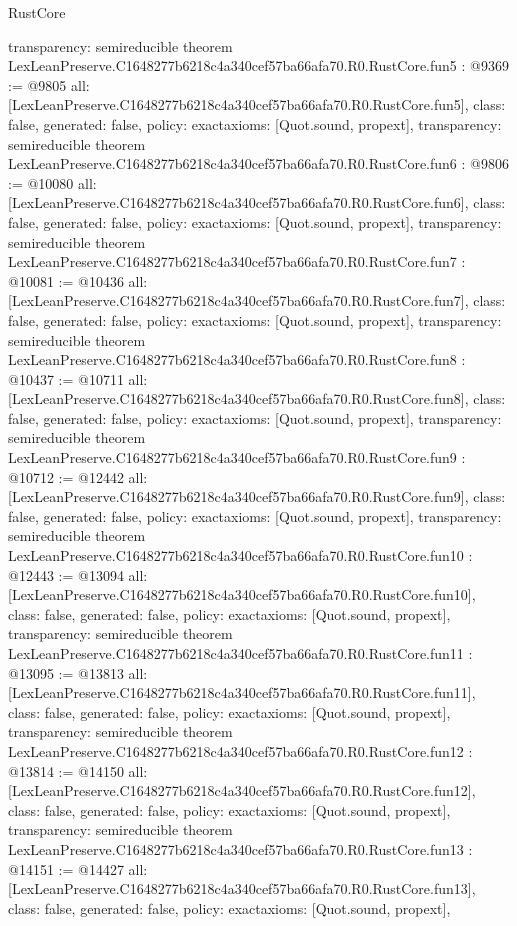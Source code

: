 \begin{lexlean}{RustCore}
\begin{coremodule}
{  transparency: semireducible
}
theorem LexLeanPreserve.C1648277b6218c4a340cef57ba66afa70.R0.RustCore.fun5 : @9369 := @9805 {
  all: [LexLeanPreserve.C1648277b6218c4a340cef57ba66afa70.R0.RustCore.fun5],
  class: false,
  generated: false,
  policy: exact{axioms: [Quot.sound, propext]},
  transparency: semireducible
}
theorem LexLeanPreserve.C1648277b6218c4a340cef57ba66afa70.R0.RustCore.fun6 : @9806 := @10080 {
  all: [LexLeanPreserve.C1648277b6218c4a340cef57ba66afa70.R0.RustCore.fun6],
  class: false,
  generated: false,
  policy: exact{axioms: [Quot.sound, propext]},
  transparency: semireducible
}
theorem LexLeanPreserve.C1648277b6218c4a340cef57ba66afa70.R0.RustCore.fun7 : @10081 := @10436 {
  all: [LexLeanPreserve.C1648277b6218c4a340cef57ba66afa70.R0.RustCore.fun7],
  class: false,
  generated: false,
  policy: exact{axioms: [Quot.sound, propext]},
  transparency: semireducible
}
theorem LexLeanPreserve.C1648277b6218c4a340cef57ba66afa70.R0.RustCore.fun8 : @10437 := @10711 {
  all: [LexLeanPreserve.C1648277b6218c4a340cef57ba66afa70.R0.RustCore.fun8],
  class: false,
  generated: false,
  policy: exact{axioms: [Quot.sound, propext]},
  transparency: semireducible
}
theorem LexLeanPreserve.C1648277b6218c4a340cef57ba66afa70.R0.RustCore.fun9 : @10712 := @12442 {
  all: [LexLeanPreserve.C1648277b6218c4a340cef57ba66afa70.R0.RustCore.fun9],
  class: false,
  generated: false,
  policy: exact{axioms: [Quot.sound, propext]},
  transparency: semireducible
}
theorem LexLeanPreserve.C1648277b6218c4a340cef57ba66afa70.R0.RustCore.fun10 : @12443 := @13094 {
  all: [LexLeanPreserve.C1648277b6218c4a340cef57ba66afa70.R0.RustCore.fun10],
  class: false,
  generated: false,
  policy: exact{axioms: [Quot.sound, propext]},
  transparency: semireducible
}
theorem LexLeanPreserve.C1648277b6218c4a340cef57ba66afa70.R0.RustCore.fun11 : @13095 := @13813 {
  all: [LexLeanPreserve.C1648277b6218c4a340cef57ba66afa70.R0.RustCore.fun11],
  class: false,
  generated: false,
  policy: exact{axioms: [Quot.sound, propext]},
  transparency: semireducible
}
theorem LexLeanPreserve.C1648277b6218c4a340cef57ba66afa70.R0.RustCore.fun12 : @13814 := @14150 {
  all: [LexLeanPreserve.C1648277b6218c4a340cef57ba66afa70.R0.RustCore.fun12],
  class: false,
  generated: false,
  policy: exact{axioms: [Quot.sound, propext]},
  transparency: semireducible
}
theorem LexLeanPreserve.C1648277b6218c4a340cef57ba66afa70.R0.RustCore.fun13 : @14151 := @14427 {
  all: [LexLeanPreserve.C1648277b6218c4a340cef57ba66afa70.R0.RustCore.fun13],
  class: false,
  generated: false,
  policy: exact{axioms: [Quot.sound, propext]},
}
\end{coremodule}
\end{lexlean}
